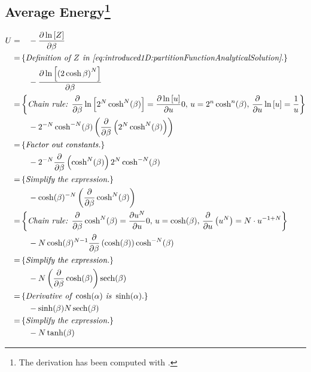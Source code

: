 \subsection[]{Average Energy\footnote{The derivation has been computed with \textcite{math}.}}
	\label{a:derivations:averageEnergy}
	\begin{align*}
		\firstline{
			\averageEnergy
		}{
			- \frac{\partial \ln \left[ \partitionfunction \right]}{\partial \beta}
		}
		\comment{
			\textit{Definition of \partitionfunction in \cref{eq:introduced1D:partitionFunctionAnalyticalSolution}}.
		}
		\content{
			- \frac{\partial \ln \left[ \left(2 \cosh \beta \right)^N \right]}{\partial \beta}
		}
		\comment{
			\textit{Chain rule: } 
			\frac{\partial}{\partial \beta}\ln\left[2^N \cosh^N(\beta) \right] = \frac{\partial \ln\left[ u \right]}{\partial u} 0, \, 
			u = 2^n \cosh^n(\beta),\,
			\frac{\partial}{\partial u} \ln\left[ u \right] = \frac{1}{u}
		}
		\content{
			- 2^{-N} \cosh^{-N}(\beta) \left( \frac{\partial}{\partial \beta} \left( 2^N \cosh^N(\beta)\right)\right)
		}
		\comment{
			\textit{Factor out constants.}
		}
		\content{
 			- 2^{- N} \frac{\partial}{\partial \beta}\left(\cosh^{N}(\beta)\right) 2^{N} \cosh^{-N}(\beta)
		}
		\comment{
			\textit{Simplify the expression.}
		}
		\content{
			-\cosh(\beta) ^{-N} \left(\frac{\partial}{\partial \beta} \cosh^{N}(\beta)\right)
		}
		\comment{
			\textit{Chain rule: } \frac{\partial}{\partial \beta} \cosh^{N}(\beta)=\frac{\partial u^N}{\partial u} 0,\, 
			u = \cosh(\beta),\, 
			\frac{\partial}{\partial u}\left(u^N\right) = N \cdot u^{-1 + N}
		}
		\content{
			- N \cosh(\beta)^{N-1} \frac{\partial}{\partial \beta}\left( \cosh (\beta) \right) \cosh^{-N} (\beta)
		}
		\comment{
			\textit{Simplify the expression.}
		}
		\content{
			- N \left(\frac{\partial}{\partial \beta} \cosh(\beta) \right) \sech(\beta)
		}
		\comment{
			\textit{Derivative of } \cosh(\alpha) \textit{ is } \sinh(\alpha).
		}
		\content{
			- \sinh(\beta) N \sech(\beta)
		}
		\comment{
			\textit{Simplify the expression.}
		}
		\content{
		- N \tanh(\beta)
		}
	\end{align*}

